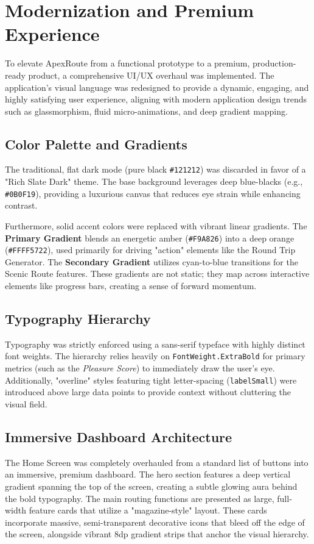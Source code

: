 \documentclass[12pt,a4paper,oneside]{report}
\begin{document}
\section{Modernization and Premium Experience}
To elevate ApexRoute from a functional prototype to a premium, production-ready product, a comprehensive UI/UX overhaul was implemented. The application's visual language was redesigned to provide a dynamic, engaging, and highly satisfying user experience, aligning with modern application design trends such as glassmorphism, fluid micro-animations, and deep gradient mapping.

\subsection{Color Palette and Gradients}
The traditional, flat dark mode (pure black \texttt{\#121212}) was discarded in favor of a "Rich Slate Dark" theme. The base background leverages deep blue-blacks (e.g., \texttt{\#0B0F19}), providing a luxurious canvas that reduces eye strain while enhancing contrast. 

Furthermore, solid accent colors were replaced with vibrant linear gradients. The \textbf{Primary Gradient} blends an energetic amber (\texttt{\#F9A826}) into a deep orange (\texttt{\#FFFF5722}), used primarily for driving "action" elements like the Round Trip Generator. The \textbf{Secondary Gradient} utilizes cyan-to-blue transitions for the Scenic Route features. These gradients are not static; they map across interactive elements like progress bars, creating a sense of forward momentum.

\subsection{Typography Hierarchy}
Typography was strictly enforced using a sans-serif typeface with highly distinct font weights. The hierarchy relies heavily on \texttt{FontWeight.ExtraBold} for primary metrics (such as the \textit{Pleasure Score}) to immediately draw the user's eye. Additionally, "overline" styles featuring tight letter-spacing (\texttt{labelSmall}) were introduced above large data points to provide context without cluttering the visual field.

\subsection{Immersive Dashboard Architecture}
The Home Screen was completely overhauled from a standard list of buttons into an immersive, premium dashboard. The hero section features a deep vertical gradient spanning the top of the screen, creating a subtle glowing aura behind the bold typography. The main routing functions are presented as large, full-width feature cards that utilize a "magazine-style" layout. These cards incorporate massive, semi-transparent decorative icons that bleed off the edge of the screen, alongside vibrant 8dp gradient strips that anchor the visual hierarchy.
\end{document}

